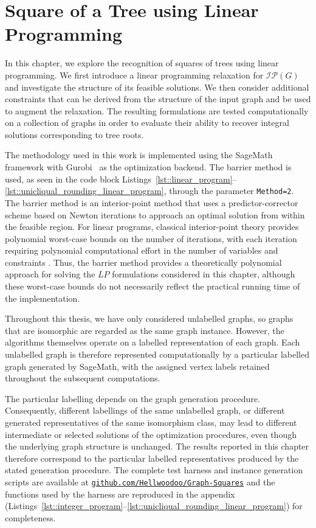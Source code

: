 \documentclass[11pt]{report}
\begin{document}
\chapter{Square of a Tree using Linear Programming} \label{chap::square_of_a_tree_LP}

In this chapter, we explore the recognition of squares of trees using linear programming. We first introduce a linear programming relaxation for $\mathcal{IP}(G)$ and investigate the structure of its feasible solutions. We then consider additional constraints that can be derived from the structure of the input graph and be used to augment the relaxation. The resulting formulations are tested computationally on a collection of graphs in order to evaluate their ability to recover integral solutions corresponding to tree roots.

The methodology used in this work is implemented using the SageMath~\cite{sagemath} framework with Gurobi~\cite{gurobi} as the optimization backend. The barrier method is used, as seen in the code block Listings~\ref{lst::linear_program}--\ref{lst::unicliqual_rounding_linear_program}, through the parameter \texttt{Method=2}. The barrier method is an interior-point method that uses a predictor-corrector scheme based on Newton iterations to approach an optimal solution from within the feasible region. For linear programs, classical interior-point theory provides polynomial worst-case bounds on the number of iterations, with each iteration requiring polynomial computational effort in the number of variables and constraints \cite{gonzaga_1991_barrier_function}. Thus, the barrier method provides a theoretically polynomial approach for solving the $LP$ formulations considered in this chapter, although these worst-case bounds do not necessarily reflect the practical running time of the implementation. 

Throughout this thesis, we have only considered unlabelled graphs, so graphs that are isomorphic are regarded as the same graph instance. However, the algorithms themselves operate on a labelled representation of each graph. Each unlabelled graph is therefore represented computationally by a particular labelled graph generated by SageMath, with the assigned vertex labels retained throughout the subsequent computations.

The particular labelling depends on the graph generation procedure. Consequently, different labellings of the same unlabelled graph, or different generated representatives of the same isomorphism class, may lead to different intermediate or selected solutions of the optimization procedures, even though the underlying graph structure is unchanged. The results reported in this chapter therefore correspond to the particular labelled representatives produced by the stated generation procedure. The complete test harness and instance generation scripts are available at \href{https://github.com/Hellwoodoo/Graph-Squares}{\texttt{github.com/Hellwoodoo/Graph-Squares}} and the functions used by the harness are reproduced in the appendix (Listings~\ref{lst::integer_program}--\ref{lst::unicliqual_rounding_linear_program}) for completeness.
\end{document}
